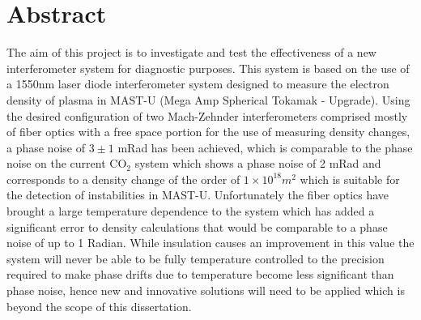 \documentclass[12pt,a4paper,oneside]{report}
\begin{document}

\chapter{Abstract}
The aim of this project is to investigate and test the effectiveness of a new interferometer system for diagnostic purposes. This system is based on the use of a 1550nm laser diode \cite{KoheronLaserV1} interferometer system designed to measure the electron density of plasma in MAST-U (Mega Amp Spherical Tokamak - Upgrade). Using the desired configuration of two Mach-Zehnder interferometers comprised mostly of fiber optics with a free space portion for the use of measuring density changes, a phase noise of $3 \pm 1$ mRad has been achieved, which is comparable to the phase noise on the current CO$_{2}$ system which shows a phase noise of 2 mRad and corresponds to a density change of the order of $1\times 10^{18} m^{2}$ which is suitable for the detection of instabilities in MAST-U. Unfortunately the fiber optics have brought a large temperature dependence to the system which has added a significant error to density calculations that would be comparable to a phase noise of up to 1 Radian. While insulation causes an improvement in this value the system will never be able to be fully temperature controlled to the precision required to make phase drifts due to temperature become less significant than phase noise, hence new and innovative solutions will need to be applied which is beyond the scope of this dissertation.

\end{document}
